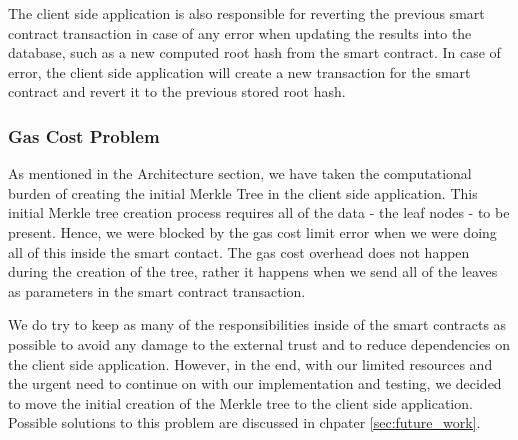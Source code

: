 The client side application is also responsible for reverting the previous smart contract transaction in case of any error when updating the results into the database, such as a new computed root hash from the smart contract. In case of error, the client side application will create a new transaction for the smart contract and revert it to the previous stored root hash.

\subsubsection*{Gas Cost Problem}

As mentioned in the Architecture section, we have taken the computational burden of creating the initial Merkle Tree in the client side application. This initial Merkle tree creation process requires all of the data - the leaf nodes - to be present. Hence, we were blocked by the gas cost limit error when we were doing all of this inside the smart contact. The gas cost overhead does not happen during the creation of the tree, rather it happens when we send all of the leaves as parameters in the smart contract transaction. 

We do try to keep as many of the responsibilities inside of the smart contracts as possible to avoid any damage to the external trust and to reduce dependencies on the client side application. However, in the end, with our limited resources and the urgent need to continue on with our implementation and testing, we decided to move the initial creation of the Merkle tree to the client side application. Possible solutions to this problem are discussed in chpater \ref{sec:future_work}.
